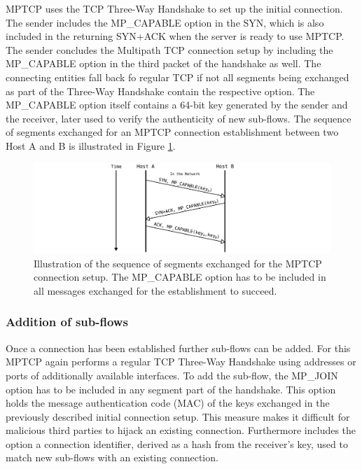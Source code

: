 MPTCP uses the TCP Three-Way Handshake to set up the initial connection. The sender includes the MP\_CAPABLE option in the SYN, which is also included in the returning SYN+ACK when the server is ready to use MPTCP. The sender concludes the Multipath TCP connection setup by including the MP\_CAPABLE option in the third packet of the handshake as well. The connecting entities fall back fo regular TCP if not all segments being exchanged as part of the Three-Way Handshake contain the respective option. The MP\_CAPABLE option itself contains a 64-bit key generated by the sender and the receiver, later used to verify the authenticity of new sub-flows. The sequence of segments exchanged for an MPTCP connection establishment between two Host A and B is illustrated in Figure \ref{fig:MTCPConnectionEstablishment}.

\begin{figure}[H]
	\begin{center} 
		\def\svgwidth{1\textwidth}
		\includegraphics[scale=0.24]{../illustrations/importantConcepts/MPTCPHandshake.pdf} 
		\caption[Caption for the list of figures.]{Illustration of the sequence of segments exchanged for the MPTCP connection setup. The MP\_CAPABLE option has to be included in all messages exchanged for the establishment to succeed.}
		\label{fig:MTCPConnectionEstablishment}
	\end{center}
\end{figure}

\subsubsection{Addition of sub-flows}

Once a connection has been established further sub-flows can be added. For this MPTCP again performs a regular TCP Three-Way Handshake using addresses or ports of additionally available interfaces. To add the sub-flow, the MP\_JOIN option has to be included in any segment part of the handshake. This option holds the message authentication code (MAC) of the keys exchanged in the previously described initial connection setup. This measure makes it difficult for malicious third parties to hijack an existing connection. Furthermore includes the option a connection identifier, derived as a hash from the receiver's key, used to match new sub-flows with an existing connection. 

